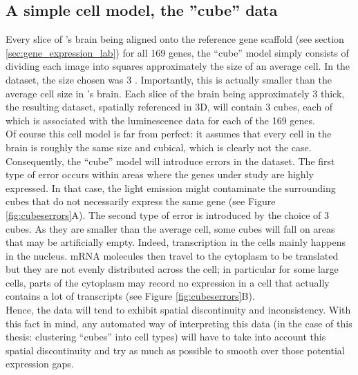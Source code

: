   \subsection{A simple cell model, the ''cube'' data}
  
  Every slice of \platy{}'s brain being aligned onto the reference gene scaffold (see section \ref{sec:gene_expression_lab}) for all 169 genes, the ``cube'' model simply consists of dividing each image into squares approximately the size of an average cell. In the \platy{} dataset, the size chosen was 3  \cite{Fischer10}. Importantly, this is actually smaller than the average cell size in \platy{}'s brain. Each slice of the brain being approximately 3 \microm{} thick, the resulting dataset, spatially referenced in 3D, will contain 3  cubes, each of which is associated with the luminescence data for each of the 169 genes.\\
  
  Of course this cell model is far from perfect: it assumes that every cell in the brain is roughly the same size and cubical, which is clearly not the case. Consequently, the ``cube'' model will introduce errors in the dataset. The first type of error occurs within areas where the genes under study are highly expressed. In that case, the light emission might contaminate the surrounding cubes that do not necessarily express the same gene (see Figure \ref{fig:cubeserrors}A). The second type of error is introduced by the choice of 3  cubes. As they are smaller than the average cell, some cubes will fall on areas that may be artificially empty. Indeed, transcription in the cells mainly happens in the nucleus. mRNA molecules then travel to the cytoplasm to be translated but they are not evenly distributed across the cell; in particular for some large cells, parts of the cytoplasm may record no expression in a cell that actually contains a lot of transcripts (see Figure \ref{fig:cubeserrors}B).\\
  
  Hence, the data will tend to exhibit spatial discontinuity and inconsistency. With this fact in mind, any automated way of interpreting this data (in the case of this thesis: clustering ``cubes'' into cell types) will have to take into account this spatial discontinuity and try as much as possible to smooth over those potential expression gaps.\\
  
